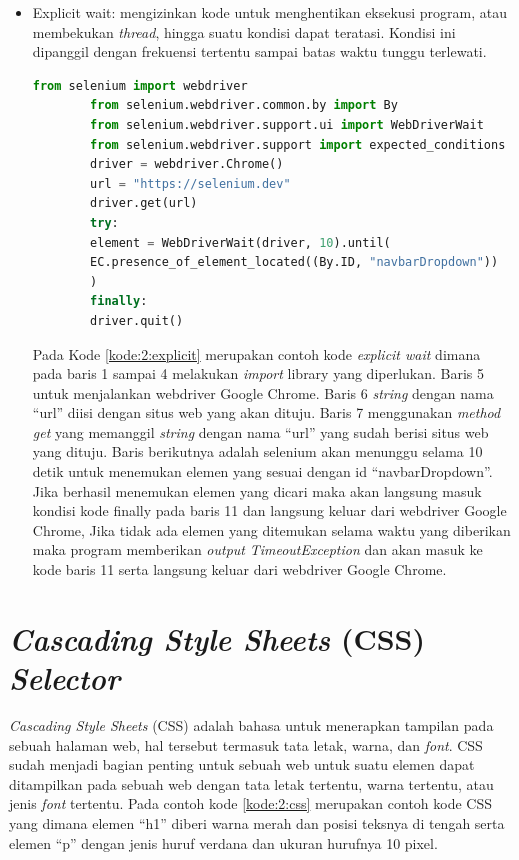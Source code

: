 \begin{itemize}
	\item Explicit wait: mengizinkan kode untuk menghentikan eksekusi program, atau membekukan \textit{thread}, hingga suatu kondisi dapat teratasi. Kondisi ini dipanggil dengan frekuensi tertentu sampai batas waktu tunggu terlewati.
	\begin{lstlisting}[language=python, caption=Contoh kode Explicit wait, label=kode:2:explicit]
		from selenium import webdriver
		from selenium.webdriver.common.by import By
		from selenium.webdriver.support.ui import WebDriverWait
		from selenium.webdriver.support import expected_conditions as EC
		driver = webdriver.Chrome()
		url = "https://selenium.dev"
		driver.get(url)	
		try:
		element = WebDriverWait(driver, 10).until(
		EC.presence_of_element_located((By.ID, "navbarDropdown"))
		)
		finally:
		driver.quit()
	\end{lstlisting}
	Pada Kode \ref{kode:2:explicit} merupakan contoh kode \textit{explicit wait} dimana pada baris 1 sampai 4 melakukan \textit{import} library yang diperlukan. Baris 5 untuk menjalankan webdriver Google Chrome. Baris 6 \textit{string} dengan nama ``url'' diisi dengan situs web yang akan dituju. Baris 7 menggunakan \textit{method get} yang memanggil \textit{string} dengan nama ``url'' yang sudah berisi situs web yang dituju. Baris berikutnya adalah selenium akan menunggu selama 10 detik untuk menemukan elemen yang sesuai dengan id ``navbarDropdown''. Jika berhasil menemukan elemen yang dicari maka akan langsung masuk kondisi kode finally pada baris 11 dan langsung keluar dari webdriver Google Chrome, Jika tidak ada elemen yang ditemukan selama waktu yang diberikan maka program memberikan \textit{output} \textit{TimeoutException} dan akan masuk ke kode baris 11 serta langsung keluar dari webdriver Google Chrome.	
\end{itemize}

\section{\textit{Cascading Style Sheets} (CSS) \textit{Selector}}
\label{sec:css}
\textit{Cascading Style Sheets} (CSS) adalah bahasa untuk menerapkan tampilan pada sebuah halaman web, hal tersebut termasuk tata letak, warna, dan \textit{font}\cite{css}. CSS sudah menjadi bagian penting untuk sebuah web untuk suatu elemen dapat ditampilkan pada sebuah web dengan tata letak tertentu, warna tertentu, atau jenis \textit{font} tertentu. Pada contoh kode \ref{kode:2:css} merupakan contoh kode CSS yang dimana elemen ``h1'' diberi warna merah dan posisi teksnya di tengah serta elemen ``p'' dengan jenis huruf verdana dan ukuran hurufnya 10 pixel.

